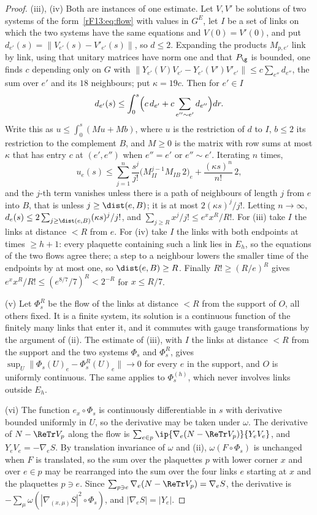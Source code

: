 \begin{proof}
(iii), (iv) Both are instances of one estimate. Let $V,V'$ be solutions of
two systems of the form~\eqref{rF13:eq:flow} with values in $G^E$, let $I$
be a set of links on which the two systems have the same equations and
$V(0)=V'(0)$, and put $d_{e'}(s)=\|V_{e'}(s)-V'_{e'}(s)\|$, so $d\le2$.
Expanding the products $M_{p,e'}$ link by link, using that unitary
matrices have norm one and that $P_\g$ is bounded, one finds $c$ depending
only on $G$ with $\|Y_{e'}(V)V_{e'}-Y_{e'}(V')V'_{e'}\|\le c\sum_{e''}
d_{e''}$, the sum over $e'$ and its $18$ neighbours; put $\kappa=19c$.
Then for $e'\in I$
\[
d_{e'}(s)\le\int_0^s\Bigl(c\,d_{e'}+c\sum_{e''\sim e'}d_{e''}\Bigr)dr .
\]
Write this as $u\le\int_0^s(Mu+Mb)$, where $u$ is the restriction of $d$ to
$I$, $b\le2$ its restriction to the complement $B$, and $M\ge0$ is the
matrix with row sums at most $\kappa$ that has entry $c$ at $(e',e'')$ when
$e''=e'$ or $e''\sim e'$. Iterating $n$ times,
\[
u_e(s)\le\sum_{j=1}^n\frac{s^j}{j!}\bigl(M_{II}^{j-1}M_{IB}\,2\bigr)_e
+\frac{(\kappa s)^n}{n!}\,2 ,
\]
and the $j$-th term vanishes unless there is a path of neighbours of length
$j$ from $e$ into $B$, that is unless $j\ge\dist(e,B)$; it is at most
$2(\kappa s)^j/j!$. Letting $n\to\infty$, $d_e(s)\le2\sum_{j\ge\dist(e,B)}
(\kappa s)^j/j!$, and $\sum_{j\ge R}x^j/j!\le e^xx^R/R!$. For (iii) take
$I$ the links at distance $<R$ from $e$. For (iv) take $I$ the links with
both endpoints at times $\ge h+1$: every plaquette containing such a link
lies in $E_h$, so the equations of the two flows agree there; a step to a
neighbour lowers the smaller time of the endpoints by at most one, so
$\dist(e,B)\ge R$. Finally $R!\ge(R/e)^R$ gives
$e^xx^R/R!\le(e^{8/7}/7)^R<2^{-R}$ for $x\le R/7$.

(v) Let $\Phi^R_s$ be the flow of the links at distance $<R$ from the
support of $O$, all others fixed. It is a finite system, its solution is a
continuous function of the finitely many links that enter it, and it
commutes with gauge transformations by the argument of (ii). The estimate
of (iii), with $I$ the links at distance $<R$ from the support and the two
systems $\Phi_s$ and $\Phi^R_s$, gives $\sup_U\|\Phi_s(U)_e-\Phi^R_s(U)_e\|
\to0$ for every $e$ in the support, and $O$ is uniformly continuous. The same
applies to $\Phi^{(h)}_s$, which never involves links outside $E_h$.

(vi) The function $e_x\circ\Phi_s$ is continuously differentiable in $s$
with derivative bounded uniformly in $U$, so the derivative may be taken
under $\omega$. The derivative of $N-\ReTr V_p$ along the flow is
$\sum_{e\in p}\ip{\nabla_e(N-\ReTr V_p)}{Y_eV_e}$, and $Y_eV_e=-\nabla_eS$.
By translation invariance of $\omega$ and (ii), $\omega(F\circ\Phi_s)$ is
unchanged when $F$ is translated, so the sum over the plaquettes $p$ with
lower corner $x$ and over $e\in p$ may be rearranged into the sum over the
four links $e$ starting at $x$ and the plaquettes $p\ni e$. Since
$\sum_{p\ni e}\nabla_e(N-\ReTr V_p)=\nabla_eS$, the derivative is
$-\sum_\mu\omega(|\nabla_{(x,\mu)}S|^2\circ\Phi_s)$, and $|\nabla_eS|=|Y_e|$.
\end{proof}

